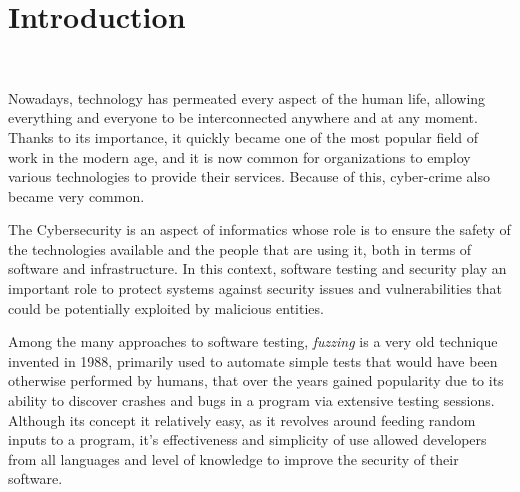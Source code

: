 \chapter{Introduction}
\ \\


Nowadays, technology has permeated every aspect of the human life, allowing everything and everyone to be interconnected anywhere and at any moment. Thanks to its importance, it quickly became one of the most popular field of work in the modern age, and it is now common for organizations to employ various technologies to provide their services. Because of this, cyber-crime also became very common.

The Cybersecurity is an aspect of informatics whose role is to ensure the safety of the technologies available and the people that are using it, both in terms of software and infrastructure. In this context, software testing and security play an important role to protect systems against security issues and vulnerabilities that could be potentially exploited by malicious entities.


Among the many approaches to software testing, \textit{fuzzing} is a very old technique invented in 1988, primarily used to automate simple tests that would have been otherwise performed by humans, that over the years gained popularity due to its ability to discover crashes and bugs in a program via extensive testing sessions. Although its concept it relatively easy, as it revolves around feeding random inputs to a program, it's effectiveness and simplicity of use allowed developers from all languages and level of knowledge to improve the security of their software.

